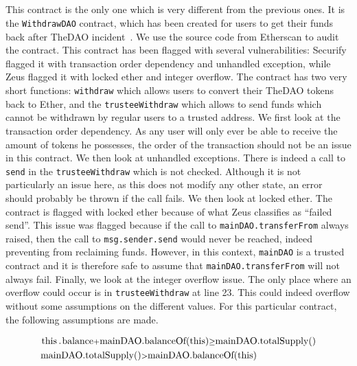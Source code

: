 \subsection*{}
This contract is the only one which is very different from the previous ones. It is the \lstinline{WithdrawDAO} contract, which has been created for users to get their funds back after TheDAO incident~\cite{Securities2017}. We use the source code from Etherscan to audit the contract.
This contract has been flagged with several vulnerabilities: Securify flagged it with transaction order dependency and unhandled exception, while Zeus flagged it with locked ether and integer overflow.
The contract has two very short functions: \lstinline{withdraw} which allows users to convert their TheDAO tokens back to Ether, and the \lstinline{trusteeWithdraw} which allows to send funds which cannot be withdrawn by regular users to a trusted address.
We first look at the transaction order dependency. As any user will only ever be able to receive the amount of tokens he possesses, the order of the transaction should not be an issue in this contract. We then look at unhandled exceptions. There is indeed a call to \lstinline{send} in the \lstinline{trusteeWithdraw} which is not checked. Although it is not particularly an issue here, as this does not modify any other state, an error should probably be thrown if the call fails. We then look at locked ether. The contract is flagged with locked ether because of what Zeus classifies as ``failed send''. This issue was flagged because if the call to \lstinline{mainDAO.transferFrom} always raised, then the call to \lstinline{msg.sender.send} would never be reached, indeed preventing from reclaiming funds. However, in this context, \lstinline{mainDAO} is a trusted contract and it is therefore safe to assume that \lstinline{mainDAO.transferFrom} will not always fail. Finally, we look at the integer overflow issue. The only place where an overflow could occur is in \lstinline{trusteeWithdraw} at line 23. This could indeed overflow without some assumptions on the different values. For this particular contract, the following assumptions are made.

\lstset{
  basicstyle=\ttfamily,
  mathescape
}
\begin{align*}
  &\text{\lstinline{this.balance}} \mbox{\footnotesize $+$} \text{\lstinline{mainDAO.balanceOf(this)}} \mbox{\footnotesize $\geq$} \text{\lstinline{mainDAO.totalSupply()}}\\
  &\text{\lstinline{mainDAO.totalSupply()}} \mbox{\footnotesize $>$} \text{\lstinline{mainDAO.balanceOf(this)}}
\end{align*}

